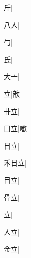 \begin{multicols}{2}
{{\cjk{}{\cnsym{}　}{\cnsym{}　}斤}|{}\par
{八人}|{}\par
{\cjk{}{\cnsym{}　}{\cnsym{}　}勹}|{}\par
{\cjk{}{\cnsym{}　}{\cnsym{}　}氏}|{}\par
{\cjk{}{\cnsym{}　}大亠}|{}\par
{\cjk{}{\cnsym{}　}{\cnsym{}　}立}|{\cjk{}歆}\par
{\cjk{}{\cnsym{}　}卄立}|{}\par
{\cjk{}{\cnsym{}　}口立}|{\cjk{}噷}\par
{\cjk{}{\cnsym{}　}日立}|{}\par
{\cjk{}禾日立}|{}\par
{\cjk{}{\cnsym{}　}目立}|{}\par
{\cjk{}{\cnsym{}　}骨立}|{}\par
{立}|{}\par
{\cjk{}{\cnsym{}　}人立}|{}\par
{\cjk{}{\cnsym{}　}金立}|{}\par
}
\end{multicols}
